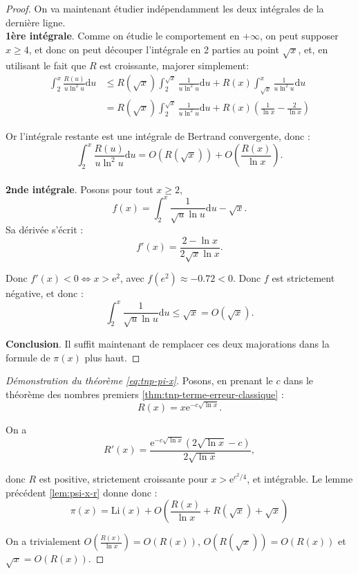 \documentclass[french]{report}
\begin{document}
\begin{proof}
  On va maintenant étudier indépendamment les deux intégrales de la dernière ligne.
  \\

  \textbf{1ère intégrale}. Comme on étudie le comportement en $+\infty$, on peut supposer $x\geq4$, et donc on peut découper l'intégrale en 2 parties au point $\sqrt{x}$, et, en utilisant le fait que $R$ est croissante, majorer simplement:
  \begin{align*}
    \int_2^x \frac{R(u)}{u\ln^2 u}\mathrm{d}u
    &\leq R(\sqrt{x})\int_2^{\sqrt{x}} \frac{1}{u\ln^2u}\mathrm{d}u
    + R(x)\int_{\sqrt{x}}^x \frac{1}{u\ln^2u}\mathrm{d}u \\
    &= R(\sqrt{x})\int_2^{\sqrt{x}} \frac{1}{u\ln^2u}\mathrm{d}u
    + R(x)\left(\frac{1}{\ln x}-\frac{2}{\ln x}\right)
  \end{align*}
  
  Or l'intégrale restante est une intégrale de Bertrand convergente, donc :
  \[
    \int_2^x \frac{R(u)}{u\ln^2 u}\mathrm{d}u
    = O(R(\sqrt{x})) + O\left(\frac{R(x)}{\ln x}\right).
  \]
  \\

  \textbf{2nde intégrale}. Posons pour tout $x\geq2$,
  \[
    f(x) = \int_2^x\frac{1}{\sqrt{u}\ln u}\mathrm{d}u - \sqrt{x}.
  \]
  Sa dérivée s'écrit :
  \[
    f'(x)=\frac{2-\ln x}{2\sqrt{x}\ln x}.
  \]

  Donc $f'(x)<0\Leftrightarrow x>\mathrm{e}^2$, avec $f(e^2)\approx-0.72<0$. Donc $f$ est strictement négative, et donc :
  \[
    \int_2^x\frac{1}{\sqrt{u}\ln u}\mathrm{d}u 
    \leq \sqrt{x}
    = O(\sqrt{x}).
  \]

  \textbf{Conclusion}. Il suffit maintenant de remplacer ces deux majorations dans la formule de $\pi(x)$ plus haut.
\end{proof}

\begin{proof}[Démonstration du théorème \ref{eq:tnp-pi-x}]
  Posons, en prenant le $c$ dans le théorème des nombres premiers \ref{thm:tnp-terme-erreur-classique} :
  \[
    R(x) = x\mathrm{e}^{-c\sqrt{\ln x}}.
  \]

  On a
  \[
    R'(x) = \frac{\mathrm{e}^{-c\sqrt{\ln x}}(2\sqrt{\ln x}-c)}{2\sqrt{\ln x}},
  \]

  donc $R$ est positive, strictement croissante pour $x>\mathrm{e}^{c^2/4}$, et intégrable. Le lemme précédent \ref{lem:psi-x-r} donne donc :
  \[
    \pi(x)
    = \mathrm{Li}(x)
    + O\left(\frac{R(x)}{\ln x} + R(\sqrt{x}) + \sqrt{x}\right)
  \]

  On a trivialement $O(\frac{R(x)}{\ln x})=O(R(x))$, $O(R(\sqrt{x}))=O(R(x))$ et $\sqrt{x}=O(R(x))$.
\end{proof}
\end{document}
